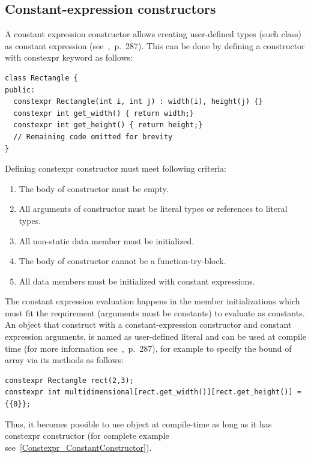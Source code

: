 \documentclass[11pt]{report}
\begin{document}
\subsection{Constant-expression constructors}
\label{subsection: Constant Expression Constructors}
A constant expression constructor allows creating user-defined types (such class) as constant expression (see~\cite{Gregorie:professionalcpp},~p.~287). This can be done by defining a constructor with constexpr keyword as follows:
\begin{lstlisting}
class Rectangle {
public:
  constexpr Rectangle(int i, int j) : width(i), height(j) {}
  constexpr int get_width() { return width;}
  constexpr int get_height() { return height;}
  // Remaining code omitted for brevity
}
\end{lstlisting}
Defining constexpr constructor must meet following criteria:
\begin{enumerate}
\item	The body of constructor must be empty.
\item	All arguments of constructor must be literal types or references to literal types.
\item   All non-static data member must be initialized.
\item	The body of constructor cannot be a function-try-block.
\item	All data members must be initialized with constant expressions.
\end{enumerate}
The constant expression evaluation happens in the member initializations which must fit the requirement (arguments must be constants) to evaluate as constants. An object that construct with a constant-expression constructor and constant expression arguments, is named as user-defined literal and can be used at compile time (for more information see~\cite{Gregorie:professionalcpp},~p.~287), for example to specify the bound of array via its methods as follows:
\begin{lstlisting}
constexpr Rectangle rect(2,3);
constexpr int multidimensional[rect.get_width()][rect.get_height()] = {{0}};
\end{lstlisting}
Thus, it becomes  possible to use object at compile-time as long as it has constexpr constructor (for complete example see~\ref{Constexpr_ConstantConstructor}).

\end{document}
